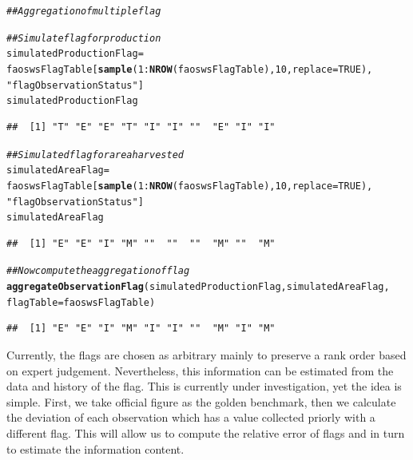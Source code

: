\documentclass[nojss]{jss}\usepackage[]{graphicx}\usepackage[]{color}
\makeatletter
\newcommand{\hlnum}[1]{\textcolor[rgb]{0.686,0.059,0.569}{#1}}%
\newcommand{\hlstr}[1]{\textcolor[rgb]{0.192,0.494,0.8}{#1}}%
\newcommand{\hlcom}[1]{\textcolor[rgb]{0.678,0.584,0.686}{\textit{#1}}}%
\newcommand{\hlopt}[1]{\textcolor[rgb]{0,0,0}{#1}}%
\newcommand{\hlstd}[1]{\textcolor[rgb]{0.345,0.345,0.345}{#1}}%
\newcommand{\hlkwb}[1]{\textcolor[rgb]{0.69,0.353,0.396}{#1}}%
\newcommand{\hlkwc}[1]{\textcolor[rgb]{0.333,0.667,0.333}{#1}}%
\newcommand{\hlkwd}[1]{\textcolor[rgb]{0.737,0.353,0.396}{\textbf{#1}}}%
\newenvironment{kframe}{%
 \def\at@end@of@kframe{}%
 \ifinner\ifhmode%
  \def\at@end@of@kframe{\end{minipage}}%
  \begin{minipage}{\columnwidth}%
 \fi\fi%
 \def\FrameCommand##1{\hskip\@totalleftmargin \hskip-\fboxsep
 \colorbox{shadecolor}{##1}\hskip-\fboxsep
     \hskip-\linewidth \hskip-\@totalleftmargin \hskip\columnwidth}%
 \MakeFramed {\advance\hsize-\width
   \@totalleftmargin\z@ \linewidth\hsize
   \@setminipage}}%
 {\par\unskip\endMakeFramed%
 \at@end@of@kframe}
\newenvironment{knitrout}{}{} %
\makeatother
\begin{document}
\begin{knitrout}
\color{fgcolor}\begin{kframe}
\begin{alltt}
\hlcom{## Aggregation of multiple flag}

\hlcom{## Simulate flag for production}
\hlstd{simulatedProductionFlag} \hlkwb{=}
    \hlstd{faoswsFlagTable[}\hlkwd{sample}\hlstd{(}\hlnum{1}\hlopt{:}\hlkwd{NROW}\hlstd{(faoswsFlagTable),} \hlnum{10}\hlstd{,} \hlkwc{replace} \hlstd{=} \hlnum{TRUE}\hlstd{),}
                    \hlstr{"flagObservationStatus"}\hlstd{]}
\hlstd{simulatedProductionFlag}
\end{alltt}
\begin{verbatim}
##  [1] "T" "E" "E" "T" "I" "I" ""  "E" "I" "I"
\end{verbatim}
\begin{alltt}
\hlcom{## Simulated flag for area harvested}
\hlstd{simulatedAreaFlag} \hlkwb{=}
    \hlstd{faoswsFlagTable[}\hlkwd{sample}\hlstd{(}\hlnum{1}\hlopt{:}\hlkwd{NROW}\hlstd{(faoswsFlagTable),} \hlnum{10}\hlstd{,} \hlkwc{replace} \hlstd{=} \hlnum{TRUE}\hlstd{),}
                    \hlstr{"flagObservationStatus"}\hlstd{]}
\hlstd{simulatedAreaFlag}
\end{alltt}
\begin{verbatim}
##  [1] "E" "E" "I" "M" ""  ""  ""  "M" ""  "M"
\end{verbatim}
\begin{alltt}
\hlcom{## Now compute the aggregation of flag}
\hlkwd{aggregateObservationFlag}\hlstd{(simulatedProductionFlag, simulatedAreaFlag,}
                         \hlkwc{flagTable} \hlstd{= faoswsFlagTable)}
\end{alltt}
\begin{verbatim}
##  [1] "E" "E" "I" "M" "I" "I" ""  "M" "I" "M"
\end{verbatim}
\end{kframe}
\end{knitrout}


Currently, the flags are chosen as arbitrary mainly to preserve a rank
order based on expert judgement. Nevertheless, this information can be
estimated from the data and history of the flag. This is currently
under investigation, yet the idea is simple. First, we take official
figure as the golden benchmark, then we calculate the deviation of
each observation which has a value collected priorly with a different
flag. This will allow us to compute the relative error of flags and in
turn to estimate the information content.
\end{document}
